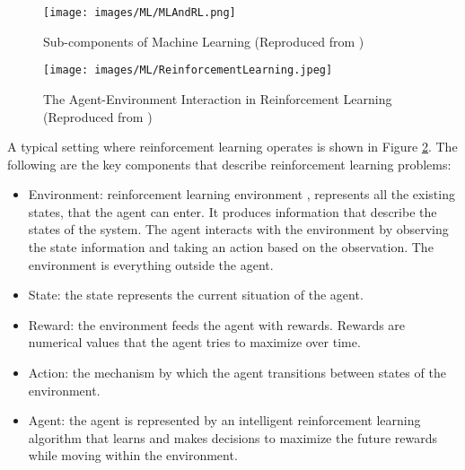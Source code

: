\documentclass[11pt,letterpaper]{ryersonSGSThesis}
\begin{document}
\begin{ryersonSGSThesis}
            \begin{figure}[!tbh]
                \centering
                \texttt{[image: images/ML/MLAndRL.png]}
                \caption{Sub-components of Machine Learning (Reproduced from \cite{Nian2020})}
                \label{fig:MLRL}
            \end{figure}
            
            \begin{figure}[!tbh]
                \centering
                \texttt{[image: images/ML/ReinforcementLearning.jpeg]}
                \caption{The Agent-Environment Interaction in Reinforcement Learning (Reproduced from \cite{Montague1999})}
                \label{fig:RLElements} 
            \end{figure}
            
            A typical setting where reinforcement learning operates is shown in Figure \ref{fig:RLElements}. The following are the key components that describe reinforcement learning problems:
            
            \begin{itemize}
                \item Environment: reinforcement learning environment \cite{Graesser2019}, represents all the existing states, that the agent can enter. It produces information that describe the states of the system. The agent interacts with the environment by observing the state information and taking an action based on the observation. The environment is everything outside the agent.
                \item State: the state represents the current situation of the agent.
                \item Reward: the environment feeds the agent with rewards. Rewards are numerical values that the agent tries to maximize over time.
                \item Action: the mechanism by which the agent transitions between states of the environment.
                \item Agent: the agent is represented by an intelligent reinforcement learning algorithm that learns and makes decisions to maximize the future rewards while moving within the environment. 
            \end{itemize}
            

\end{ryersonSGSThesis}
\end{document}
